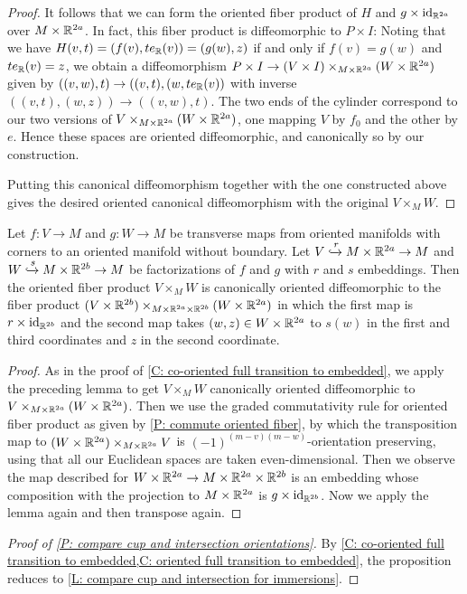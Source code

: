 \begin{proof}
	It follows that we can form the oriented fiber product of $H$ and $g \times \mathrm{id}_{\mathbb{R}^{2a}}$ over $M \times \mathbb{R}^{2a}$.
	In fact, this fiber product is diffeomorphic to $P \times I$: Noting that we have $H(v,t) = (f(v),te_{\mathbb{R}}(v)) = (g(w),z)$ if and only if $f(v) = g(w)$ and $te_{\mathbb{R}}(v) = z$, we obtain a diffeomorphism $P \times I \to (V \times I)\times_{M \times \mathbb{R}^{2a}}(W \times \mathbb{R}^{2a})$ given by $((v,w),t) \to ((v,t),(w, te_{\mathbb{R}}(v))$ with inverse $((v,t),(w,z)) \to ((v,w),t)$.
	The two ends of the cylinder correspond to our two versions of $V\times_{M \times \mathbb{R}^{2a}} (W \times \mathbb{R}^{2a})$, one mapping $V$ by $f_0$ and the other by $e$.
	Hence these spaces are oriented diffeomorphic, and canonically so by our construction.

	Putting this canonical diffeomorphism together with the one constructed above gives the desired oriented canonical diffeomorphism with the original $V \times_M W$.
\end{proof}

\begin{corollary}\label{C: oriented full transition to embedded}
	Let $f \colon V \to M$ and $g \colon W \to M$ be transverse maps from oriented manifolds with corners to an oriented manifold without boundary.
	Let $V\xhookrightarrow{r} M \times \mathbb{R}^{2a} \to M$ and $W\xhookrightarrow{s} M \times \mathbb{R}^{2b} \to M$ be factorizations of $f$ and $g$ with $r$ and $s$ embeddings.
	Then the oriented fiber product $V \times_M W$ is canonically oriented diffeomorphic to the fiber product $(V \times \mathbb{R}^{2b})\times_{M \times \mathbb{R}^{2a} \times \mathbb{R}^{2b}}(W \times \mathbb{R}^{2a})$ in which the first map is $r \times \mathrm{id}_{\mathbb{R}^{2b}}$ and the second map takes $(w,z) \in W \times \mathbb{R}^{2a}$ to $s(w)$ in the first and third coordinates and $z$ in the second coordinate.
\end{corollary}
\begin{proof}
	As in the proof of \cref{C: co-oriented full transition to embedded},
	we apply the preceding lemma to get $V \times_M W$ canonically oriented diffeomorphic to $V\times_{M \times \mathbb{R}^{2a}}(W \times \mathbb{R}^{2a})$.
	Then we use the graded commutativity rule for oriented fiber product as given by \cref{P: commute oriented fiber},
	by which
	the transposition map to $(W \times \mathbb{R}^{2a})\times_{M \times \mathbb{R}^{2a}}V$ is $(-1)^{(m-v)(m-w)}$-orientation preserving, using that all our Euclidean spaces are taken even-dimensional.
	Then we observe the map described for $W \times \mathbb{R}^{2a} \to M \times \mathbb{R}^{2a} \times \mathbb{R}^{2b}$ is an embedding whose composition with the projection to $M \times \mathbb{R}^{2a}$ is $g \times \mathrm{id}_{\mathbb{R}^{2b}}$.
	Now we apply the lemma again and then transpose again.
\end{proof}

\begin{proof}[Proof of \cref{P: compare cup and intersection orientations}]
	By \cref{C: co-oriented full transition to embedded,C: oriented full transition to embedded}, the proposition reduces to \cref{L: compare cup and intersection for immersions}.
\end{proof}

